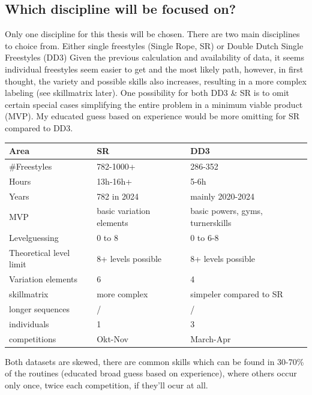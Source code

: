 \subsection{Which discipline will be focused on?}

Only one discipline for this thesis will be chosen.
There are two main disciplines to choice from. Either single freestyles (Single Rope, SR) or Double Dutch Single Freestyles (DD3)
Given the previous calculation and availability of data, it seems individual freestyles seem easier to get and the most likely path, however, in first thought, the variety and possible skills also increases, resulting in a more complex labeling (see skillmatrix later). One possibility for both DD3 \& SR is to omit certain special cases simplifying the entire problem in a minimum viable product (MVP). My educated guess based on experience would be more omitting for SR compared to DD3.


\begin{table}
    \centering
    \begin{tabular}{|l|l|l|}
        \hline
        Area & SR & DD3 \\ \hline
        \#Freestyles & 782-1000+ & 286-352 \\ \hline
        Hours & 13h-16h+ & 5-6h \\ \hline
        Years & 782 in 2024 & mainly 2020-2024 \\ \hline
        MVP & basic variation elements & basic powers, gyms, turnerskills \\ \hline
        Levelguessing & 0 to 8 & 0 to 6-8 \\ \hline
        Theoretical level limit & 8+ levels possible & 8+ levels possible \\ \hline
        Variation elements & 6 & 4 \\ \hline
        skillmatrix & more complex & simpeler compared to SR \\ \hline
        longer sequences & / & / \\ \hline
        individuals & 1 & 3 \\ \hline
        competitions & Okt-Nov & March-Apr \\ \hline
    \end{tabular}
\end{table}

Both datasets are skewed, there are common skills which can be found in 30-70\% of the routines (educated broad guess based on experience), where others occur only once, twice each competition, if they'll ocur at all.

